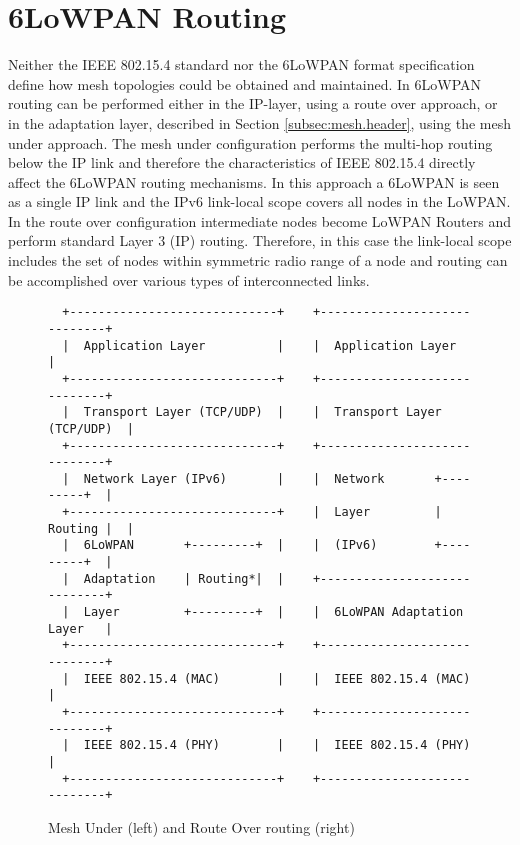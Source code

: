 \chapter{6LoWPAN Routing}\label{ch:routing}
Neither the IEEE 802.15.4 \cite{ieee802.15.4} standard nor the 6LoWPAN format specification \cite{rfc4944} define how mesh topologies could be obtained and maintained. In 6LoWPAN routing can be performed either in the IP-layer, using a route over approach, or in the adaptation layer, described in Section \ref{subsec:mesh.header}, using the mesh under approach. The mesh under configuration performs the multi-hop routing below the IP link and therefore the characteristics of IEEE 802.15.4 directly affect the 6LoWPAN routing mechanisms. In this approach a 6LoWPAN is seen as a single IP link and the IPv6 link-local scope covers all nodes in the LoWPAN. In the route over configuration intermediate nodes become LoWPAN Routers and perform standard Layer 3 (IP) routing. Therefore, in this case the link-local scope includes the set of nodes within symmetric radio range of a node and routing can be accomplished over various types of interconnected links.

\begin{figure}[htp]
\begin{mylisting}
\begin{verbatim}
  +-----------------------------+    +-----------------------------+
  |  Application Layer          |    |  Application Layer          |
  +-----------------------------+    +-----------------------------+
  |  Transport Layer (TCP/UDP)  |    |  Transport Layer (TCP/UDP)  |
  +-----------------------------+    +-----------------------------+
  |  Network Layer (IPv6)       |    |  Network       +---------+  |
  +-----------------------------+    |  Layer         | Routing |  |
  |  6LoWPAN       +---------+  |    |  (IPv6)        +---------+  |
  |  Adaptation    | Routing*|  |    +-----------------------------+
  |  Layer         +---------+  |    |  6LoWPAN Adaptation Layer   |
  +-----------------------------+    +-----------------------------+
  |  IEEE 802.15.4 (MAC)        |    |  IEEE 802.15.4 (MAC)        |
  +-----------------------------+    +-----------------------------+
  |  IEEE 802.15.4 (PHY)        |    |  IEEE 802.15.4 (PHY)        |
  +-----------------------------+    +-----------------------------+
\end{verbatim}
\end{mylisting}
\caption{Mesh Under (left) and Route Over routing (right)}\label{fig:routing}
\end{figure}

